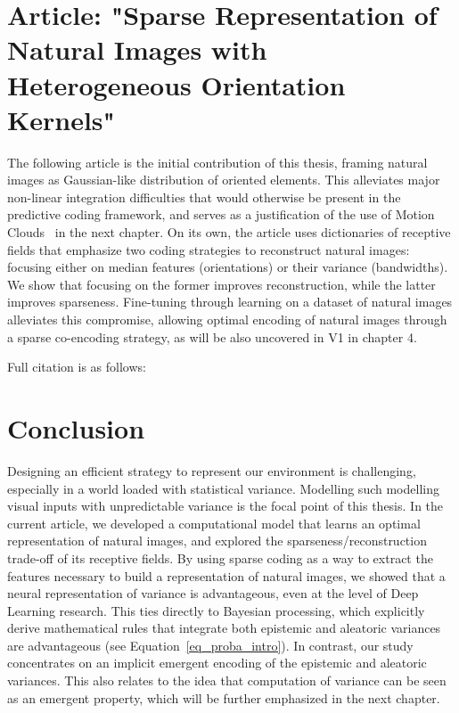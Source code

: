 \section{Article: "Sparse Representation of Natural Images with Heterogeneous Orientation Kernels"}
The following article is the initial contribution of this thesis, framing natural images as Gaussian-like distribution of oriented elements. This alleviates major non-linear integration difficulties that would otherwise be present in the predictive coding framework, and serves as a justification of the use of Motion Clouds~\cite{leon2012motion} in the next chapter. On its own, the article uses dictionaries of receptive fields that emphasize two coding strategies to reconstruct natural images: focusing either on median features (orientations) or their variance (bandwidths). We show that focusing on the former improves reconstruction, while the latter improves sparseness. Fine-tuning through learning on a dataset of natural images alleviates this compromise, allowing optimal encoding of natural images through a sparse co-encoding strategy, as will be also uncovered in \gls{V1} in chapter 4.  

Full citation is as follows: 

\section{Conclusion}
Designing an efficient strategy to represent our environment is challenging, especially in a world loaded with statistical variance. Modelling such modelling visual inputs with unpredictable variance is the focal point of this thesis. In the current article, we developed a computational model that learns an optimal representation of natural images, and explored the sparseness/reconstruction trade-off of its receptive fields. By using sparse coding as a way to extract the features necessary to build a representation of natural images, we showed that a neural representation of variance is advantageous, even at the level of Deep Learning research. This ties directly to Bayesian processing, which explicitly derive mathematical rules that integrate both epistemic and aleatoric variances are advantageous (see Equation~\ref{eq_proba_intro}). In contrast, our study concentrates on an implicit emergent encoding of the epistemic and aleatoric variances. This also relates to the idea that computation of variance can be seen as an emergent property, which will be further emphasized in the next chapter. 

